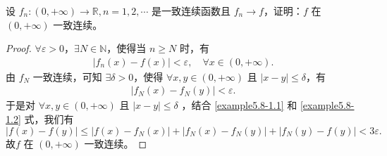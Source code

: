 \documentclass[../../main.tex]{subfiles}%
\begin{document}
\begin{example}
设 \( f_n : (0, +\infty) \to \mathbb{R}, n = 1, 2, \cdots \) 是一致连续函数且 \( f_n \rightarrow f \)，证明：\( f \) 在 \( (0, +\infty) \) 一致连续。
\end{example}
\begin{proof}
$\forall \varepsilon > 0$，$\exists N \in \mathbb{N}$，使得当 $n \geqslant N$ 时，有
\begin{align}
\left| f_n\left( x \right) - f\left( x \right) \right| < \varepsilon, \quad \forall x \in \left( 0, +\infty \right). \label{example5.8-1.1}
\end{align}
由 $f_N$ 一致连续，可知 $\exists \delta > 0$，使得 $\forall x, y \in \left( 0, +\infty \right)$ 且 $\left| x - y \right| \leqslant \delta$，有
\begin{align}
\left| f_N\left( x \right) - f_N\left( y \right) \right| < \varepsilon. \label{example5.8-1.2}
\end{align}
于是对 $\forall x, y \in \left( 0, +\infty \right)$ 且 $\left| x - y \right| \leqslant \delta$ ，结合 \eqref{example5.8-1.1} 和 \eqref{example5.8-1.2} 式，我们有
\[
\left| f\left( x \right) - f\left( y \right) \right| \leqslant \left| f\left( x \right) - f_N\left( x \right) \right| + \left| f_N\left( x \right) - f_N\left( y \right) \right| + \left| f_N\left( y \right) - f\left( y \right) \right| < 3\varepsilon.
\]
故\( f \) 在 \( (0, +\infty) \) 一致连续。
\end{proof}
\end{document}

